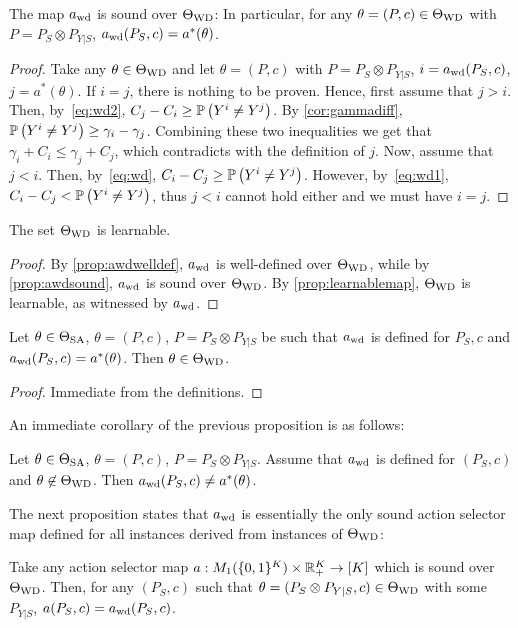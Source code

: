 \begin{prop}
\label{prop:awdsound}
The map $a_{\mathrm{wd}}$ is sound over $\Theta_{\mathrm{WD}}$: In particular, for any
$\theta = (P,c)\in \Theta_{\mathrm{WD}}$ with $P = P_S\otimes P_{Y|S}$, $a_{\mathrm{wd}}(P_S,c)= a^*(\theta)$.
\end{prop}
\begin{proof}
Take any $\theta\in \Theta_{\mathrm{WD}}$ and let $\theta = (P,c)$ with $P = P_S\otimes P_{Y|S}$, $i = a_{\mathrm{wd}}(P_S,c)$, $j = a^*(\theta)$.
If $i=j$, there is nothing to be proven. Hence, first assume that $j>i$. Then, by~\eqref{eq:wd2}, $C_j - C_i \ge \mathbb{P}\left(Y^i \ne Y^j\right)$.
By \cref{cor:gammadiff}, $\mathbb{P}\left(Y^i \ne Y^j \right) \ge \gamma_i - \gamma_j$. Combining these two inequalities we get that
$\gamma_i + C_i \le \gamma_j + C_j$, which contradicts with the definition of $j$.
Now, assume that $j<i$. Then, by~\eqref{eq:wd}, $C_i - C_j \ge \mathbb{P}\left(Y^i \ne Y^j\right)$.
However, by~\eqref{eq:wd1}, $C_i -C_j < \mathbb{P}\left(Y^i \ne Y^j\right)$, thus $j<i$ cannot hold either and we must have $i=j$.
\end{proof}
\begin{cor}\label{cor:twdlearnable}
The set $\Theta_{\mathrm{WD}}$ is learnable.
\end{cor}
\begin{proof}
By \cref{prop:awdwelldef}, $a_{\mathrm{wd}}$ is well-defined over $\Theta_{\mathrm{WD}}$, while by \cref{prop:awdsound}, $a_{\mathrm{wd}}$ is sound over $\Theta_{\mathrm{WD}}$.
By \cref{prop:learnablemap}, $\Theta_{\mathrm{WD}}$ is learnable, as witnessed by $a_{\mathrm{wd}}$. 
\end{proof}
\begin{prop}
\label{prop:awdcorrectimplieswd}
Let $\theta \in \Theta_{\mathrm{SA}}$, $\theta = (P,c)$, $P = P_S\otimes P_{Y|S}$ be such that $a_{\mathrm{wd}}$ is defined for $P_S,c$
and $a_{\mathrm{wd}}(P_S,c) = a^*(\theta)$. Then $\theta \in \Theta_{\mathrm{WD}}$.
\end{prop}
\begin{proof}
Immediate from the definitions.
\end{proof}
An immediate corollary of the previous proposition is as follows:
\begin{cor}\label{cor:awdoutsideincorrect}
Let $\theta \in \Theta_{\mathrm{SA}}$, $\theta = (P,c)$, $P = P_S \otimes P_{Y|S}$. 
Assume that $a_{\mathrm{wd}}$ is defined for $(P_S,c)$ and $\theta \not\in \Theta_{\mathrm{WD}}$. Then $a_{\mathrm{wd}}(P_S,c) \ne a^*(\theta)$.
\end{cor}
The next proposition states that $a_{\mathrm{wd}}$ is essentially the only sound action selector map defined for
 all instances derived from instances of $\Theta_{\mathrm{WD}}$:
\begin{prop}\label{prop:awdunique}
Take any action selector map $a: M_1( \{0,1\}^K ) \times \mathbb{R}_+^K \to [K]$ which is sound over $\Theta_{\mathrm{WD}}$.
Then, for any $(P_S,c)$ such that $\theta = (P_S\otimes P_{Y|S},c)\in \Theta_{\mathrm{WD}}$ with some $P_{Y|S}$,
 $a(P_S,c) = a_{\mathrm{wd}}(P_S,c)$.
\end{prop}
